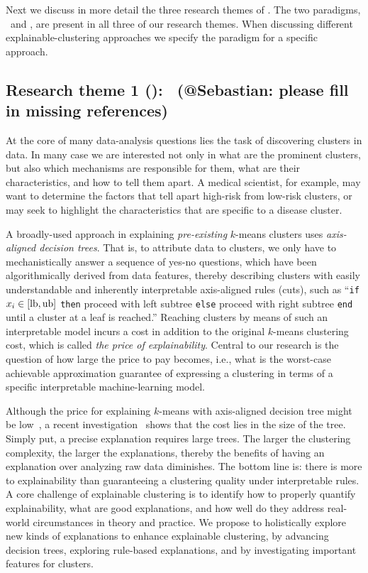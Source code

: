 \documentclass[a4paper,11pt]{article}
\begin{document}
Next we discuss in more detail the three research themes of \acronym.
The two paradigms, \posthoc\ and \joint, are present in all three of our research themes.
When discussing different explainable-clustering approaches 
we specify the paradigm for a specific approach.

\subsection*{Research theme 1 (\rto): \newmodels\ {\color{orange}(@Sebastian: please fill in missing references)}}

At the core of many data-analysis questions lies the task of discovering clusters in data. 
In many case we are interested not only in what are the prominent clusters, 
but also which mechanisms are responsible for them,  
what are their characteristics, and how to tell them apart.  
A medical scientist, for example, may want to determine the factors that tell apart 
high-risk from low-risk clusters, 
or may seek to highlight the characteristics that are specific to a disease cluster.  

A broadly-used \posthoc approach in explaining \emph{pre-existing} $k$-means clusters uses 
\emph{axis-aligned decision trees}. 
That is, to attribute data to clusters, 
we only have to mechanistically answer a sequence of yes-no questions, 
which have been algorithmically derived from data features, 
thereby describing clusters with easily understandable and inherently interpretable axis-aligned rules (cuts), 
such as 
``\texttt{if} $x_i \in [\textnormal{lb}, \textnormal{ub}]$ \texttt{then} 
proceed with left subtree \texttt{else} proceed with right subtree \texttt{end} until a cluster at a leaf is reached.''
Reaching clusters by means of such an interpretable model incurs 
a cost in addition to the original $k$-means clustering cost, 
which is called \emph{the price of explainability}.
Central to our research is the question of how large the price to pay becomes, i.e., 
what is the worst-case achievable approximation guarantee of expressing a clustering 
in terms of a specific interpretable machine-learning model. 

Although the price for explaining $k$-means with axis-aligned decision tree might be low~\cite{XXX}, 
a recent investigation~\cite{XXX} shows that the cost lies in the size of the tree.
Simply put, a precise explanation requires large trees.
The larger the clustering complexity, the larger the explanations, thereby 
the benefits of having an explanation over analyzing raw data diminishes.
The bottom line is: there is more to explainability than guaranteeing a clustering quality under interpretable rules.
A core challenge of explainable clustering is to identify how to properly quantify explainability,
what are good explanations, and how well do they address real-world circumstances in theory and practice.
We propose to holistically explore new kinds of explanations to enhance explainable clustering,
by advancing decision trees, exploring rule-based explanations, and by investigating important features for clusters.
\end{document}
